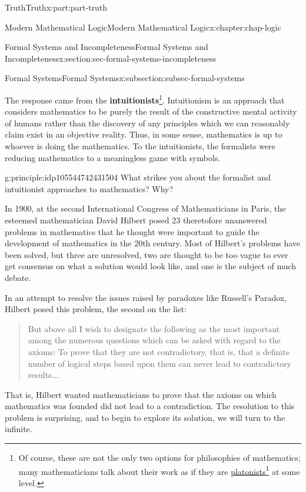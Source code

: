 \documentclass[oneside,10pt,]{book}
\newcommand{\terminology}[1]{\textbf{#1}}
\numberwithin{equation}{section}
\begin{document}
\begin{partptx}{Truth}{}{Truth}{}{}{x:part:part-truth}
\begin{chapterptx}{Modern Mathematical Logic}{}{Modern Mathematical Logic}{}{}{x:chapter:chap-logic}
\begin{sectionptx}{Formal Systems and Incompleteness}{}{Formal Systems and Incompleteness}{}{}{x:section:sec-formal-systems-incompleteness}
\begin{subsectionptx}{Formal Systems}{}{Formal Systems}{}{}{x:subsection:subsec-formal-systems}
\par
The response came from the \terminology{intuitionists}\footnote{Of course, these are not the only two options for philosophies of mathematics; many mathematicians talk about their work as if they are \href{https://plato.stanford.edu/entries/platonism-mathematics/}{platonists}\footnote{\nolinkurl{https://plato.stanford.edu/entries/platonism-mathematics/}\label{g:fn:idp105544742430992}} at some level.\label{g:fn:idp105544742430352}}. Intuitionism is an approach that considers mathematics to be purely the result of the constructive mental activity of humans rather than the discovery of any principles which we can reasonably claim exist in an objective reality. Thus, in some sense, mathematics is up to whoever is doing the mathematics. To the intuitionists, the formalists were reducing mathematics to a meaningless game with symbols.%
\begin{principle}{}{}{g:principle:idp105544742431504}%
What strikes you about the formalist and intuitionist approaches to mathematics? Why?%
\end{principle}
In 1900, at the second International Congress of Mathematicians in Paris, the esteemed mathematician David Hilbert posed 23 theretofore unanswered problems in mathematics that he thought were important to guide the development of mathematics in the 20th century. Most of Hilbert's problems have been solved, but three are unresolved, two are thought to be too vague to ever get consensus on what a solution would look like, and one is the subject of much debate.%
\par
In an attempt to resolve the issues raised by paradoxes like Russell's Paradox, Hilbert posed this problem, the second on the list:%
\begin{quote}%
But above all I wish to designate the following as the most important among the numerous questions which can be asked with regard to the axioms: To prove that they are not contradictory, that is, that a definite number of logical steps based upon them can never lead to contradictory results….\end{quote}
That is, Hilbert wanted mathematicians to prove that the axioms on which mathematics was founded did not lead to a contradiction. The resolution to this problem is surprising, and to begin to explore its solution, we will turn to the infinite.%
\end{subsectionptx}
%
%
\typeout{************************************************}
\typeout{************************************************}

\end{sectionptx}
\end{chapterptx}
\end{partptx}
\end{document}
